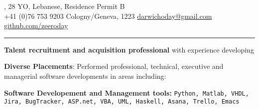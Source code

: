 \documentclass[a4paper, 10pt, oneside]{article}
\begin{document}

\begin{center}

\color{headings}\textsc{\Huge{}}, 28 YO, Lebanese, Residence Permit B\\
\vspace{1mm}
\color{text1}{\large\Telefon} +41 (0)76 753 9203 
\hfill {\large\faMapMarker} Cologny/Geneva, 1223 
\hfill {\large\faEnvelope} \href{mailto:darwichoday@gmail.com}{darwichoday@gmail.com} 
\hfill \color{text1}{\large\faGithub} \href{https://github.com/zeeroday}{github.com/zeeroday}
\hfill {}

\rule{\textwidth}{2pt}


\begin{flushleft}
	\textbf{\fontsize{11pt}{11}\selectfont Talent recruitment and acquisition professional }with experience developing 
\end{flushleft}

\textbf{\fontsize{11pt}{11}\selectfont Diverse Placements}: Performed professional, technical, executive and managerial software developments in areas including:

\space
{}
\space
{}

\begin{flushleft} 
	\textbf{\fontsize{10pt}{10}\selectfont Software Developement and Management tools:} \texttt{Python, Matlab, VHDL, Jira, BugTracker, ASP.net, VBA, UML, Haskell, Asana, Trello, Emacs}
\end{flushleft}
\vspace{-15pt}


\end{center}
\end{document}
